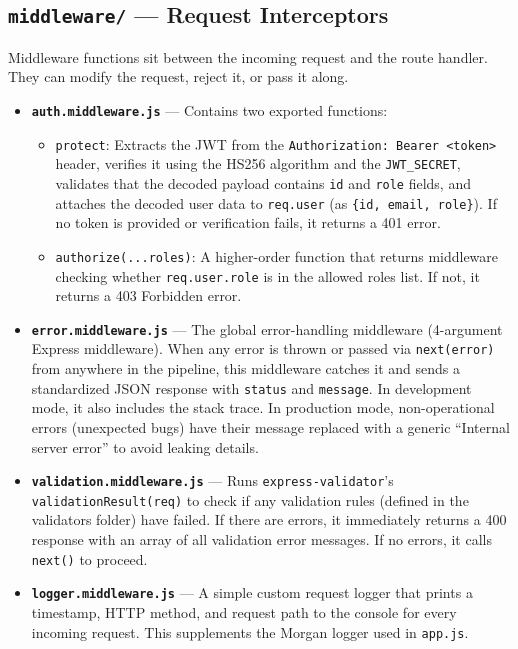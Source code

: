 \documentclass[12pt,a4paper]{article}
\begin{document}
\subsection{\texttt{middleware/} --- Request Interceptors}

Middleware functions sit between the incoming request and the route handler. They can modify the request, reject it, or pass it along.

\begin{itemize}[leftmargin=1cm]
  \item \textbf{\texttt{auth.middleware.js}} --- Contains two exported functions:
  \begin{itemize}
    \item \texttt{protect}: Extracts the JWT from the \texttt{Authorization: Bearer <token>} header, verifies it using the HS256 algorithm and the \texttt{JWT\_SECRET}, validates that the decoded payload contains \texttt{id} and \texttt{role} fields, and attaches the decoded user data to \texttt{req.user} (as \texttt{\{id, email, role\}}). If no token is provided or verification fails, it returns a 401 error.
    \item \texttt{authorize(...roles)}: A higher-order function that returns middleware checking whether \texttt{req.user.role} is in the allowed roles list. If not, it returns a 403 Forbidden error.
  \end{itemize}

  \item \textbf{\texttt{error.middleware.js}} --- The global error-handling middleware (4-argument Express middleware). When any error is thrown or passed via \texttt{next(error)} from anywhere in the pipeline, this middleware catches it and sends a standardized JSON response with \texttt{status} and \texttt{message}. In development mode, it also includes the stack trace. In production mode, non-operational errors (unexpected bugs) have their message replaced with a generic ``Internal server error'' to avoid leaking details.

  \item \textbf{\texttt{validation.middleware.js}} --- Runs \texttt{express-validator}'s \texttt{validationResult(req)} to check if any validation rules (defined in the validators folder) have failed. If there are errors, it immediately returns a 400 response with an array of all validation error messages. If no errors, it calls \texttt{next()} to proceed.

  \item \textbf{\texttt{logger.middleware.js}} --- A simple custom request logger that prints a timestamp, HTTP method, and request path to the console for every incoming request. This supplements the Morgan logger used in \texttt{app.js}.
\end{itemize}
\end{document}
